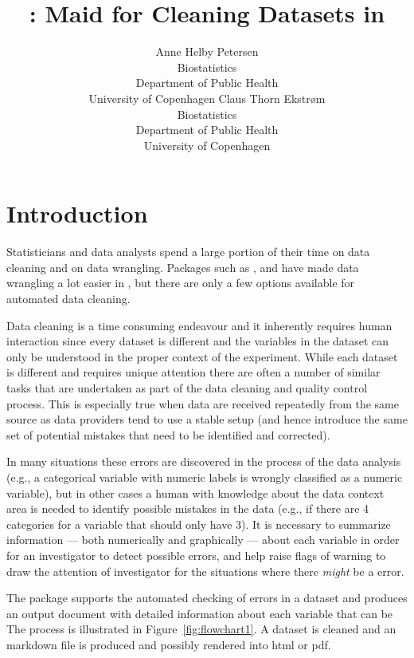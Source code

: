 \documentclass[article]{jss}
\author{Anne Helby Petersen\\Biostatistics\\Department of Public
  Health\\University of Copenhagen \And Claus Thorn Ekstr\o m\\Biostatistics\\Department of Public
  Health\\University of Copenhagen}
\title{\pkg{cleanR}: Maid for Cleaning Datasets in \proglang{R}}
\begin{document}
\section{Introduction}
Statisticians and data analysts spend a large portion of their time on
data cleaning and on data wrangling. Packages such as
, and  have made data wrangling a lot easier in
, but there are only a few options available for automated data
cleaning.

Data cleaning is a time consuming endeavour and it inherently requires
human interaction since every dataset is different and the variables
in the dataset can only be understood in the proper context of the
experiment. While each dataset is different and requires unique
attention there are often a number of similar tasks that are
undertaken as part of the data cleaning and quality control
process. This is especially true when data are received repeatedly
from the same source as data providers tend to use a stable setup (and
hence introduce the same set of potential mistakes that need to be
identified and corrected).

In many situations these errors are discovered in the process of the
data analysis (e.g., a categorical variable with numeric labels is
wrongly classified as a numeric variable), but in other cases a human
with knowledge about the data context area is needed to identify
possible mistakes in the data (e.g., if there are 4 categories for a
variable that should only have 3).  It is necessary to summarize
information --- both numerically and graphically --- about each
variable in order for an investigator to detect possible errors, and
help raise flags of warning to draw the attention of investigator for
the situations where there \emph{might} be a error.

The  package supports the automated checking of errors in
a dataset and produces an output document with detailed information
about each variable that can be
The process is illustrated in Figure~\ref{fig:flowchart1}. A dataset
is cleaned and an  markdown file is produced and possibly
rendered into html or pdf.
\end{document}
